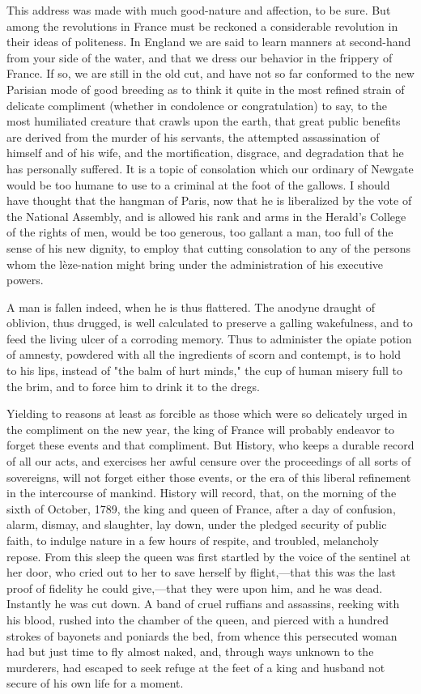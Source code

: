 This address was made with much good-nature and affection, to be sure. But among the revolutions in France must be reckoned a considerable revolution in their ideas of politeness. In England we are said to learn manners at second-hand from your side of the water, and that we dress our behavior in the frippery of France. If so, we are still in the old cut, and have not so far conformed to the new Parisian mode of good breeding as to think it quite in the most refined strain of delicate compliment (whether in condolence or congratulation) to say, to the most humiliated creature that crawls upon the earth, that great public benefits are derived from the murder of his servants, the attempted assassination of himself and of his wife, and the mortification, disgrace, and degradation that he has personally suffered. It is a topic of consolation which our ordinary of Newgate would be too humane to use to a criminal at the foot of the gallows. I should have thought that the hangman of Paris, now that he is liberalized by the vote of the National Assembly, and is allowed his rank and arms in the Herald's College of the rights of men, would be too generous, too gallant a man, too full of the sense of his new dignity, to employ that cutting consolation to any of the persons whom the lèze-nation might bring under the administration of his executive powers.

A man is fallen indeed, when he is thus flattered. The anodyne draught of oblivion, thus drugged, is well calculated to preserve a galling wakefulness, and to feed the living ulcer of a corroding memory. Thus to administer the opiate potion of amnesty, powdered with all the ingredients of scorn and contempt, is to hold to his lips, instead of "the balm of hurt minds," the cup of human misery full to the brim, and to force him to drink it to the dregs.

Yielding to reasons at least as forcible as those which were so delicately urged in the compliment on the new year, the king of France will probably endeavor to forget these events and that compliment. But History, who keeps a durable record of all our acts, and exercises her awful censure over the proceedings of all sorts of sovereigns, will not forget either those events, or the era of this liberal refinement in the intercourse of mankind. History will record, that, on the morning of the sixth of October, 1789, the king and queen of France, after a day of confusion, alarm, dismay, and slaughter, lay down, under the pledged security of public faith, to indulge nature in a few hours of respite, and troubled, melancholy repose. From this sleep the queen was first startled by the voice of the sentinel at her door, who cried out to her to save herself by flight,—that this was the last proof of fidelity he could give,—that they were upon him, and he was dead. Instantly he was cut down. A band of cruel ruffians and assassins, reeking with his blood, rushed into the chamber of the queen, and pierced with a hundred strokes of bayonets and poniards the bed, from whence this persecuted woman had but just time to fly almost naked, and, through ways unknown to the murderers, had escaped to seek refuge at the feet of a king and husband not secure of his own life for a moment.

